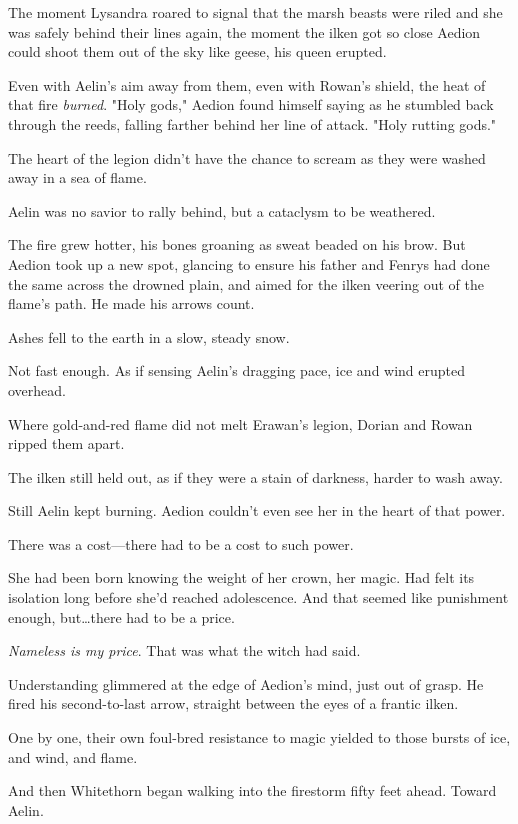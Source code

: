 The moment Lysandra roared to signal that the marsh beasts were riled and she was safely behind their lines again, the moment the ilken got so close Aedion could shoot them out of the sky like geese, his queen erupted.

Even with Aelin's aim away from them, even with Rowan's shield, the heat of that fire \emph{burned}.
"Holy gods," Aedion found himself saying as he stumbled back through the reeds, falling farther behind her line of attack.
"Holy rutting gods."

The heart of the legion didn't have the chance to scream as they were washed away in a sea of flame.

Aelin was no savior to rally behind, but a cataclysm to be weathered.

The fire grew hotter, his bones groaning as sweat beaded on his brow.
But Aedion took up a new spot, glancing to ensure his father and Fenrys had done the same across the drowned plain, and aimed for the ilken veering out of the flame's path.
He made his arrows count.

Ashes fell to the earth in a slow, steady snow.

Not fast enough.
As if sensing Aelin's dragging pace, ice and wind erupted overhead.

Where gold-and-red flame did not melt Erawan's legion, Dorian and Rowan ripped them apart.

The ilken still held out, as if they were a stain of darkness, harder to wash away.

Still Aelin kept burning.
Aedion couldn't even see her in the heart of that power.

There was a cost---there had to be a cost to such power.

She had been born knowing the weight of her crown, her magic.
Had felt its isolation long before she'd reached adolescence.
And that seemed like punishment enough, but\ldots there had to be a price.

\emph{Nameless is my price}.
That was what the witch had said.

Understanding glimmered at the edge of Aedion's mind, just out of grasp.
He fired his second-to-last arrow, straight between the eyes of a frantic ilken.

One by one, their own foul-bred resistance to magic yielded to those bursts of ice, and wind, and flame.

And then Whitethorn began walking into the firestorm fifty feet ahead.
Toward Aelin.

